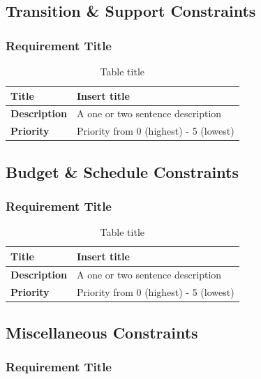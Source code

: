 \documentclass{article}
\begin{document}
\subsection{Transition \& Support Constraints}

\subsubsection{Requirement Title}

\begin{table}[H]
	\caption{Table title}
	\begin{tabularx}{\textwidth}{|l|X|}
		\hline
		\textbf{Title}       & Insert title                           \\ \hline
		\textbf{Description} & A one or two sentence description      \\ \hline
		\textbf{Priority}    & Priority from 0 (highest) - 5 (lowest) \\ \hline
	\end{tabularx}
\end{table}

\subsection{Budget \& Schedule Constraints}

\subsubsection{Requirement Title}

\begin{table}[H]
	\caption{Table title}
	\begin{tabularx}{\textwidth}{|l|X|}
		\hline
		\textbf{Title}       & Insert title                           \\ \hline
		\textbf{Description} & A one or two sentence description      \\ \hline
		\textbf{Priority}    & Priority from 0 (highest) - 5 (lowest) \\ \hline
	\end{tabularx}
\end{table}

\subsection{Miscellaneous Constraints}

\subsubsection{Requirement Title}
\end{document}
